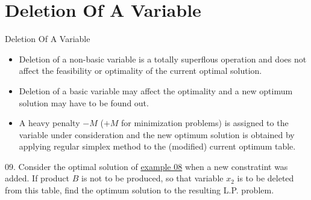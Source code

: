 
\section{Deletion Of A Variable}
\label{sec:deletion-variable}

\begin{frame}{Deletion Of A Variable}{}
  \begin{itemize} \justifying \parskip3mm
  \item Deletion of a \alert{non-basic variable} is a totally superflous operation and does not affect the feasibility or optimality of the current optimal solution.
  \item Deletion of a \alert{basic variable} may affect the optimality and a new optimum solution may have to be found out.
  \item A \alert{heavy penalty} $-M$ ($+M$ for minimization problems) is assigned to the variable under consideration and the new optimum solution is obtained by \alert{applying regular simplex method} to the (modified) current optimum table.
  \end{itemize}
\end{frame}

\begin{frameExample}{09.}{}
  Consider the optimal solution of \hyperlink{example08}{example 08} when a new  constratint was added. If product $B$ is not to be produced, so that variable $x_2$ is to be deleted from this table, find the optimum solution to the resulting L.P. problem.
  
\end{frameExample}


